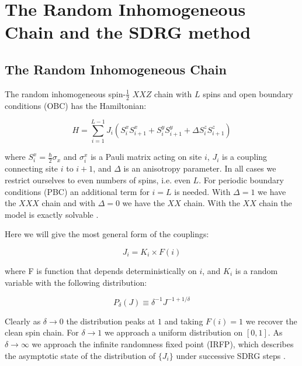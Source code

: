 \section{The Random Inhomogeneous Chain and the SDRG method}\label{sec:sdrg}

\subsection{The Random Inhomogeneous Chain}\label{subsec:model_def}
The random inhomogeneous spin-$\frac{1}{2}$ $XXZ$ chain with $L$ spins and open boundary conditions (OBC) has the Hamiltonian:

\begin{equation}\label{eq:model_hamiltonian}
H =\sum_{i=1}^{L-1} J_{i}\left(S_{i}^{x} S_{i+1}^{x}+S_{i}^{y} S_{i+1}^{y}+\Delta S_{i}^{z} S_{i+1}^{z}\right)
\end{equation}

where $S_i^x =\frac{\hbar}{2} \sigma_x$ and $\sigma_i^x$ is a Pauli matrix acting on site $i$, $J_i$ is a coupling connecting site $i$ to $i + 1$, and $\Delta$ is an anisotropy parameter. In all cases we restrict ourselves to even numbers of spins, i.e. even $L$. For periodic boundary conditions (PBC) an additional term for $i = L$ is needed. With $\Delta = 1$ we have the $XXX$ chain and with $\Delta = 0$ we have the $XX$ chain. With the $XX$ chain the model is exactly solvable \cite{paola2016}. 

Here we will give the most general form of the couplings:

\begin{equation}\label{eq:general_coupling_form}
	J_i = K_i \times F(i)
\end{equation}

where F is function that depends deterministically on $i$, and $K_i$ is a random variable with the following distribution: 

\begin{equation}\label{eq:disorder_distribution}
	P_{\delta}(J) \equiv \delta^{-1} J^{-1+1 / \delta}
\end{equation}
	
Clearly as $\delta \to 0$ the distribution peaks at $1$ and taking $F(i) = 1$ we recover the clean spin chain. For $\delta \to 1$ we approach a uniform distribution on $[0, 1]$. As $\delta \to \infty$ we approach the infinite randomness fixed point (IRFP), which describes the asymptotic state of the distribution of $\{J_i\}$ under successive SDRG steps \cite{Fisher1994}. 

